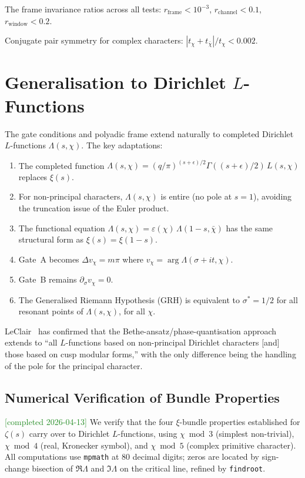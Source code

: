 \documentclass[11pt, a4paper]{article}
\theoremstyle{definition}
\theoremstyle{plain}
\newcommand{\xif}{\xi}                      %
\begin{document}
The frame invariance ratios across all tests:
$r_{\mathrm{frame}} < 10^{-3}$,
$r_{\mathrm{channel}} < 0.1$,
$r_{\mathrm{window}} < 0.2$.

Conjugate pair symmetry for complex characters:
$|t_\chi + t_{\bar{\chi}}| / t_\chi < 0.002$.


\section{Generalisation to Dirichlet $L$-Functions}
\label{app:dirichlet}

The gate conditions and polyadic frame extend naturally to completed
Dirichlet $L$-functions $\Lambda(s,\chi)$. The key adaptations:

\begin{enumerate}
  \item The completed function $\Lambda(s,\chi) = (q/\pi)^{(s+\epsilon)/2}
        \Gamma((s+\epsilon)/2)\,L(s,\chi)$ replaces $\xif(s)$.
  \item For non-principal characters, $\Lambda(s,\chi)$ is entire (no
        pole at $s=1$), avoiding the truncation issue of the Euler product.
  \item The functional equation $\Lambda(s,\chi) = \varepsilon(\chi)\,
        \Lambda(1-s,\bar{\chi})$ has the same structural form as
        $\xif(s) = \xif(1-s)$.
  \item Gate~A becomes $\Delta v_\chi = m\pi$ where
        $v_\chi = \arg\Lambda(\sigma+it,\chi)$.
  \item Gate~B remains $\partial_\sigma v_\chi = 0$.
  \item The Generalised Riemann Hypothesis (GRH) is equivalent to
        $\sigma^* = 1/2$ for all resonant points of $\Lambda(s,\chi)$,
        for all $\chi$.
\end{enumerate}

LeClair~\cite{leclair2024} has confirmed that the Bethe-ansatz/phase-quantisation
approach extends to ``all $L$-functions based on non-principal Dirichlet
characters [and] those based on cusp modular forms,'' with the only
difference being the handling of the pole for the principal character.

\subsection{Numerical Verification of Bundle Properties}
\label{app:dirichlet:verify}

\textcolor{ForestGreen}{[completed 2026-04-13]}
We verify that the four $\xi$-bundle properties established for
$\zeta(s)$ carry over to Dirichlet $L$-functions, using
$\chi\bmod 3$ (simplest non-trivial),
$\chi\bmod 4$ (real, Kronecker symbol), and
$\chi\bmod 5$ (complex primitive character).
All computations use \texttt{mpmath} at 80 decimal digits;
zeros are located by sign-change bisection of
$\Re\Lambda$ and $\Im\Lambda$ on the critical line,
refined by \texttt{findroot}.
\end{document}
